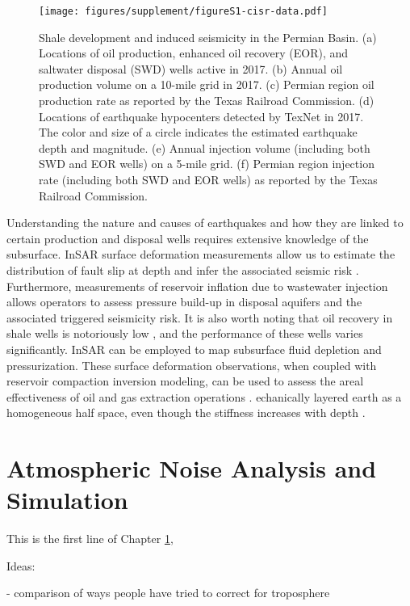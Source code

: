 \documentclass{utexasthesis}
\begin{document}
\begin{figure*}[hbt!]
\centering
\texttt{[image: figures/supplement/figureS1-cisr-data.pdf]}
\caption{Shale development and induced seismicity in the Permian Basin. (a) Locations of oil production, enhanced oil recovery (EOR), and saltwater disposal (SWD) wells active in 2017. (b) Annual oil production volume on a 10-mile grid in 2017. (c) Permian region oil production rate as reported by the Texas Railroad Commission. (d) Locations of earthquake hypocenters detected by TexNet in 2017. The color and size of a circle indicates the estimated earthquake depth and magnitude. (e) Annual injection volume (including both SWD and EOR wells) on a 5-mile grid. (f) Permian region injection rate (including both SWD and EOR wells) as reported by the Texas Railroad Commission.
}
\label{fig:Permian}
\end{figure*}

Understanding the nature and causes of earthquakes and how they are linked to certain production and disposal wells requires extensive knowledge of the subsurface. InSAR surface deformation measurements allow us to estimate the distribution of fault slip at depth and infer the associated seismic risk \cite{Segall2010, huang2017fault}. Furthermore, measurements of reservoir inflation due to wastewater injection allows operators to assess pressure build-up in disposal aquifers and the associated triggered seismicity risk. It is also worth noting that oil recovery in shale wells is notoriously low \cite{clark2009determination}, and the performance of these wells varies significantly. InSAR can be employed to map subsurface fluid depletion and pressurization. These surface deformation observations, when coupled with reservoir compaction inversion modeling, can be used to assess the areal effectiveness of oil and gas extraction operations \cite{Du2001, Vasco2005}. 
echanically layered earth as a homogeneous half space, even though the stiffness increases with depth \cite{Du1992}. 


\chapter{Atmospheric Noise Analysis and Simulation}
\label{chap:atmo-noise}

This is the first line of Chapter \ref{chap:atmo-noise}, 


Ideas:

- comparison of ways people have tried to correct for troposphere
\end{document}
